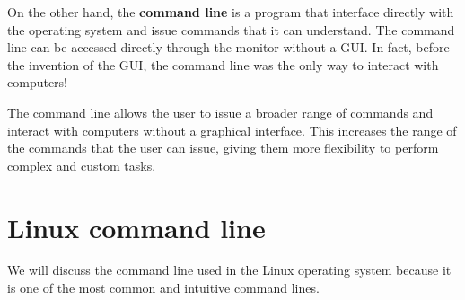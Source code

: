 On the other hand, the \textbf{command line} is a program that  interface directly with the operating system and issue commands that it can understand. The command line can be accessed directly through the monitor without a GUI. In fact, before the invention of the GUI, the command line was the only way to interact with computers!  

The command line allows the user to issue a broader range of commands and interact with computers without a graphical interface. 
This increases the range of the commands that the user can issue, giving them more flexibility to perform complex and custom tasks. \\

\section{Linux command line}

We will discuss the command line used in the Linux operating system because it is one of the most common and intuitive command lines. \\

